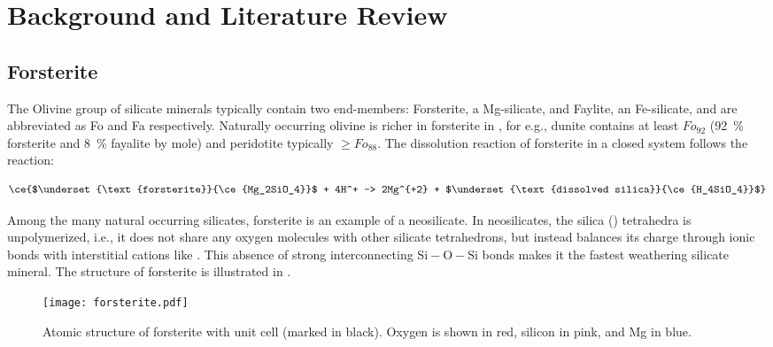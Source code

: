 \chapter{Background and Literature Review}
\section{Forsterite}
The Olivine group of silicate minerals typically contain two end-members: Forsterite, a Mg-silicate, and Faylite, an Fe-silicate, and are abbreviated as Fo and Fa respectively. Naturally occurring olivine is richer in forsterite \citep{johnson2004} in \cite{bearat2006}, for e.g., dunite contains at least $\mathit{Fo_{92}}$ (\SI{92}{\percent} forsterite and \SI{8}{\percent} fayalite by mole) and peridotite typically $\geq\mathit{Fo_{88}}$.
The dissolution reaction of forsterite in a closed system follows the reaction:

\begin{equation}\label{eq:forsterite}
\ce{$\underset{\text{forsterite}}{\ce{Mg_2SiO_4}}$ +  4H^+ -> 2Mg^{+2} + $\underset{\text{dissolved silica}}{\ce{H_4SiO_4}}$}
\end{equation}

Among the many natural occurring silicates, forsterite is an example of a neosilicate. In neosilicates, the silica () tetrahedra is unpolymerized, i.e., it does not share any oxygen molecules with other silicate tetrahedrons, but instead balances its charge through ionic bonds with interstitial cations like  \citep{olivinebritannica}. This absence of strong interconnecting $\mathrm{Si-O-Si}$ bonds makes it the fastest weathering silicate mineral. The structure of forsterite is illustrated in .
\begin{figure}[h]
\centering
\texttt{[image: forsterite.pdf]}
\caption{Atomic structure of forsterite with unit cell (marked in black). Oxygen is shown in red, silicon in pink, and Mg in blue.}
\label{fig:structure}
\end{figure}

